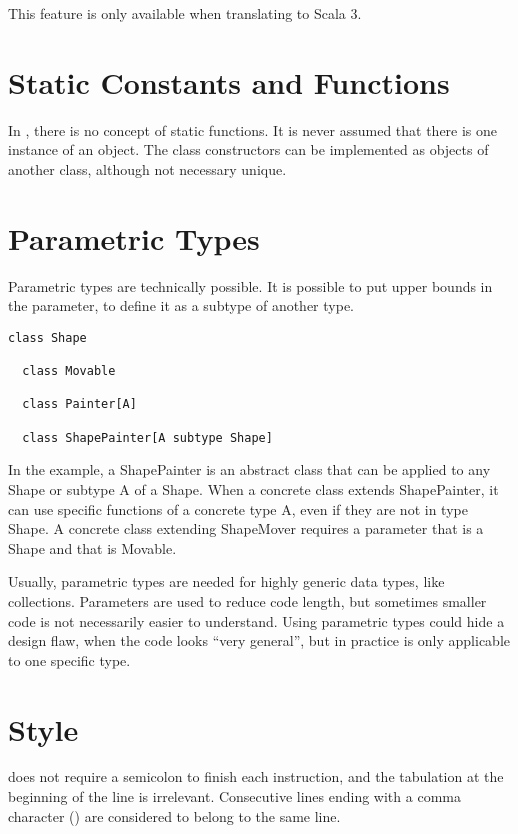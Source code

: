 This feature is only available when translating to Scala 3.


\section{Static Constants and Functions}

In \Soda, there is no concept of static functions.
It is never assumed that there is one instance of an object.
The class constructors can be implemented as objects of another class, although not necessary unique.


\section{Parametric Types}

Parametric types are technically possible.
It is possible to put upper bounds in the parameter, to define it as a subtype of another type.

\begin{lstlisting}[label={lst:exampleUpperBoundParameter}]
  class Shape

  class Movable

  class Painter[A]

  class ShapePainter[A subtype Shape]
\end{lstlisting}

In the example, a ShapePainter is an abstract class that can be applied to any Shape or subtype A of a Shape.
When a concrete class extends ShapePainter, it can use specific functions of a concrete type A, even if they are not in type Shape.
A concrete class extending ShapeMover requires a parameter that is a Shape and that is Movable.

Usually, parametric types are needed for highly generic data types, like collections.
Parameters are used to reduce code length, but sometimes smaller code is not necessarily easier to understand.
Using parametric types could hide a design flaw, when the code looks ``very general'', but in practice is only applicable to one specific type.


\section{Style}

\Soda does not require a semicolon to finish each instruction, and the tabulation at the beginning of the line is irrelevant.
Consecutive lines ending with a comma character (\srccode{,}) are considered to belong to the same line.

